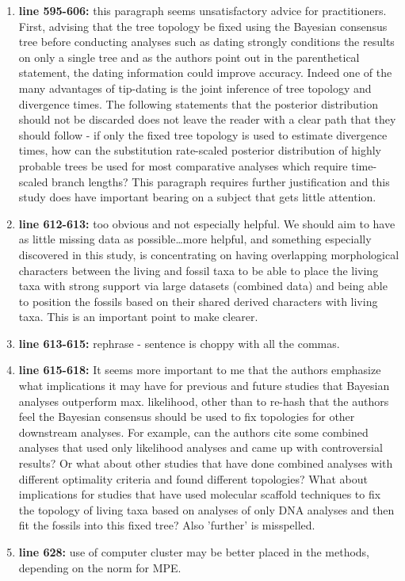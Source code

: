 \documentclass[12pt,letterpaper]{article}
\begin{document}
\begin{enumerate}
\item{\textbf{line 595-606:}} this paragraph seems unsatisfactory advice for practitioners. First, advising that the tree topology be fixed using the Bayesian consensus tree before conducting analyses such as dating strongly conditions the results on only a single tree and as the authors point out in the parenthetical statement, the dating information could improve accuracy. Indeed one of the many advantages of tip-dating is the joint inference of tree topology and divergence times. The following statements that the posterior distribution should not be discarded does not leave the reader with a clear path that they should follow - if only the fixed tree topology is used to estimate divergence times, how can the substitution rate-scaled posterior distribution of highly probable trees be used for most comparative analyses which require time-scaled branch lengths? This paragraph requires further justification and this study does have important bearing on a subject that gets little attention. 
\item{\textbf{line 612-613:}} too obvious and not especially helpful. We should aim to have as little missing data as possible…more helpful, and something especially discovered in this study, is concentrating on having overlapping morphological characters between the living and fossil taxa to be able to place the living taxa with strong support via large datasets (combined data) and being able to position the fossils based on their shared derived characters with living taxa. This is an important point to make clearer. 
\item{\textbf{line 613-615:}} rephrase - sentence is choppy with all the commas. 
\item{\textbf{line 615-618:}} It seems more important to me that the authors emphasize what implications it may have for previous and future studies that Bayesian analyses outperform max. likelihood, other than to re-hash that the authors feel the Bayesian consensus should be used to fix topologies for other downstream analyses. For example, can the authors cite some combined analyses that used only likelihood analyses and came up with controversial results? Or what about other studies that have done combined analyses with different optimality criteria and found different topologies? What about implications for studies that have used molecular scaffold techniques to fix the topology of living taxa based on analyses of only DNA analyses and then fit the fossils into this fixed tree? Also 'further' is misspelled.  
\item{\textbf{line 628:}} use of computer cluster may be better placed in the methods, depending on the norm for MPE. 


\end{enumerate}
\end{document}
